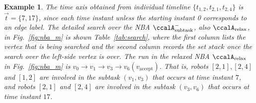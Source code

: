 \documentclass[Afour,sageh,times]{sagej}
\newtheorem{exmp}{Example}
\newcommand{\clause}[1]{\mathsf{cls}(#1)}
\newcommand{\auto}[1]{\ccalA_{\text{#1}}}
\renewcommand{\ap}[3]{\mathcal{\pi}_{{#1},{#2}}^{#3}}
\newcommand{\domanda}[1]{\subsubsection*{#1}}
\newenvironment{cexmp}
{\addtocounter{exmp}{-1}\begin{exmp}}
  {\end{exmp}}
\begin{document}




 \begin{cexmp}
   The time axis obtained from individual timeline $\{t_{1,2}, t_{2,1}, t_{2,4}\}$ is  $\vec{t} = \{7, 17\}$, since each time instant unless the starting instant 0 corresponds to an edge label.  The detailed search over the NBA $\auto{subtask}^-$, also $\auto{relax}$, in Fig.~\ref{fig:nba_m} is shown Table~\ref{tab:search}, where the first column lists the vertex that is being searched and the second column records the set $stack$ once the search over the left-side vertex is over. The run in the relaxed NBA $\auto{relax}$ in Fig.~\ref{fig:nba_m} is $v_0 \to v_1 \to v_3 \to v_6(v_{\text{accept}})$. That is, robots $[2,1], [2,4]$ and $[1,2]$ are involved in the subtask $(v_1,v_3)$ that occurs at time instant  $7$, and robots $[2,1] $ and $[2,4]$ are involved in the subtask $(v_3, v_6)$ that occurs at time instant $17$.
 \end{cexmp}
 \begin{table}[t]
   \caption{Extract a run from automaton $\auto{subtask}^-$}\label{tab:search}
   \centering
 \end{table}
\end{document}
